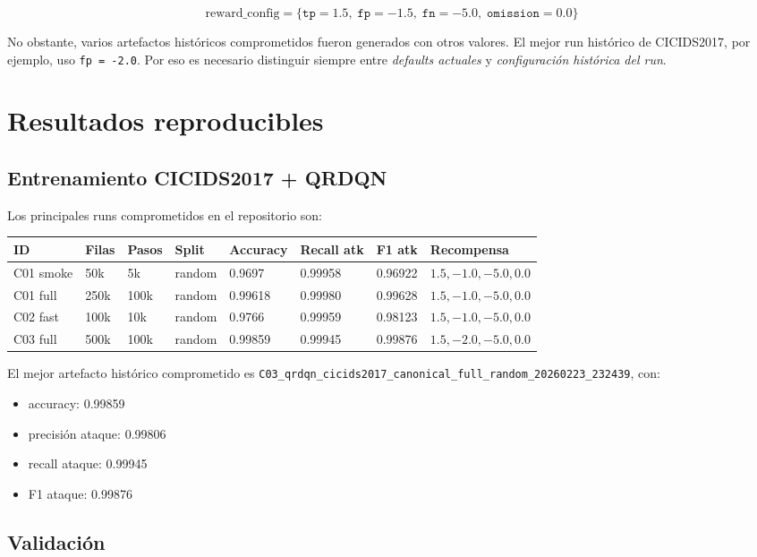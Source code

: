 \documentclass[12pt,a4paper]{report}
\begin{document}
\[
\text{reward\_config} =
\{ \texttt{tp}=1.5,\; \texttt{fp}=-1.5,\; \texttt{fn}=-5.0,\; \texttt{omission}=0.0 \}
\]

No obstante, varios artefactos históricos comprometidos fueron generados con otros
valores. El mejor run histórico de CICIDS2017, por ejemplo, uso \texttt{fp = -2.0}.
Por eso es necesario distinguir siempre entre \emph{defaults actuales} y
\emph{configuración histórica del run}.

\chapter{Resultados reproducibles}

\section{Entrenamiento CICIDS2017 + QRDQN}

Los principales runs comprometidos en el repositorio son:

\begin{center}
\begin{tabular}{llllllll}
\toprule
ID & Filas & Pasos & Split & Accuracy & Recall atk & F1 atk & Recompensa \\
\midrule
C01 smoke & 50k & 5k & random & 0.9697 & 0.99958 & 0.96922 & $1.5,-1.0,-5.0,0.0$ \\
C01 full & 250k & 100k & random & 0.99618 & 0.99980 & 0.99628 & $1.5,-1.0,-5.0,0.0$ \\
C02 fast & 100k & 10k & random & 0.9766 & 0.99959 & 0.98123 & $1.5,-1.0,-5.0,0.0$ \\
C03 full & 500k & 100k & random & 0.99859 & 0.99945 & 0.99876 & $1.5,-2.0,-5.0,0.0$ \\
\bottomrule
\end{tabular}
\end{center}

El mejor artefacto histórico comprometido es
\texttt{C03\_qrdqn\_cicids2017\_canonical\_full\_random\_20260223\_232439}, con:

\begin{itemize}
    \item accuracy: 0.99859
    \item precisión ataque: 0.99806
    \item recall ataque: 0.99945
    \item F1 ataque: 0.99876
\end{itemize}

\section{Validación}
\end{document}
